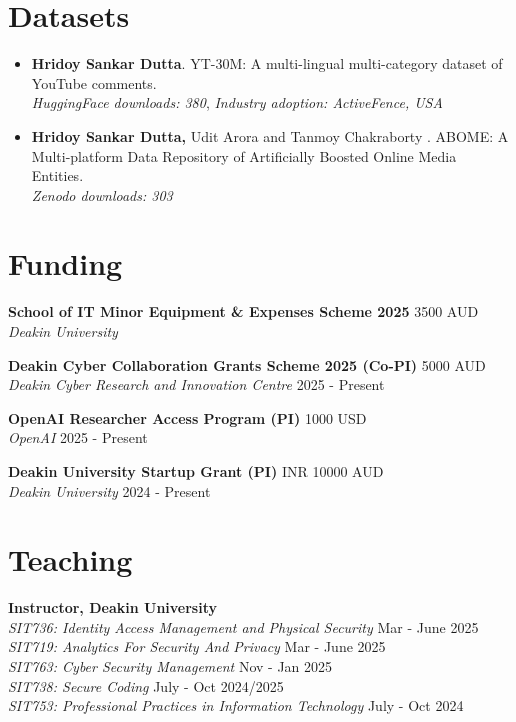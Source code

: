 \documentclass[margin, centered,lmodern]{res}
\begin{document}
\begin{resume}
\section{Datasets}
\begin{itemize}[leftmargin=*]
\item \textbf{Hridoy Sankar Dutta}. YT-30M: A multi-lingual multi-category dataset of YouTube comments.\\
\textit{\small{HuggingFace downloads: 380}},
\textit{\small{Industry adoption: ActiveFence, USA}}
\item \textbf{Hridoy Sankar Dutta,} Udit Arora and Tanmoy Chakraborty
. ABOME: A Multi-platform Data Repository of Artificially Boosted Online Media Entities.\\
\textit{\small{Zenodo downloads: 303}}
\end{itemize}
\section{Funding}
\textbf{School of IT Minor Equipment & Expenses Scheme 2025} \hfill 3500 AUD  \\
\emph{Deakin University} 

\textbf{Deakin Cyber Collaboration Grants Scheme 2025 (Co-PI)} \hfill 5000 AUD  \\
\emph{Deakin Cyber Research and Innovation Centre} \hfill 2025 - Present

\textbf{OpenAI Researcher Access Program (PI)} \hfill 1000 USD  \\
\emph{OpenAI} \hfill 2025 - Present

\textbf{Deakin University Startup Grant (PI)} \hfill INR 10000 AUD  \\
\emph{Deakin University} \hfill 2024 - Present

\section{Teaching}
\textbf{Instructor,  Deakin University} \\
\emph{SIT736: Identity Access Management and Physical Security} \hfill Mar - June 2025 \\
\emph{SIT719: Analytics For Security And Privacy} \hfill Mar - June 2025 \\
\emph{SIT763: Cyber Security Management} \hfill Nov - Jan 2025 \\
\emph{SIT738: Secure Coding} \hfill July - Oct 2024/2025 \\
\emph{SIT753: Professional Practices in Information Technology} \hfill July - Oct 2024 


\end{resume}
\end{document}
